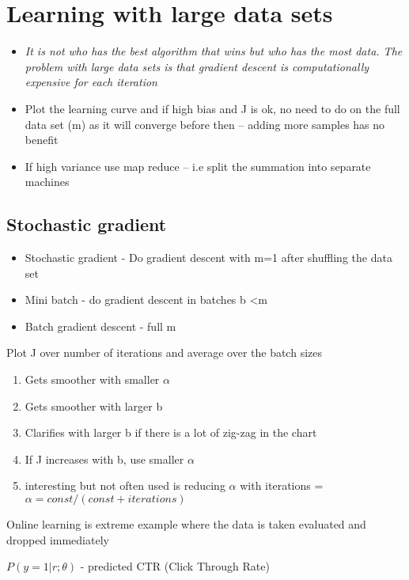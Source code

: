 \documentclass[12pt,a4paper]{article}
\begin{document}
\section{Learning with large data sets}
\begin{itemize}
\item \emph{It is not who has the best algorithm that wins but who has the most data. The problem with large data sets is that gradient descent is computationally expensive for each iteration} 
\item Plot the learning curve and if high bias and J is ok, no need to do on the full data set (m) as it will converge before then -- adding more samples has no benefit
\item If high variance use map reduce -- i.e split the summation into separate machines

\end{itemize}


\subsection{Stochastic gradient} 
\begin{itemize}
\item Stochastic gradient - Do gradient descent with m=1 after shuffling the data set
\item Mini batch - do gradient descent in batches b \textless m
\item Batch gradient descent - full m
\end{itemize}

Plot J over number of iterations and average over the batch sizes
\begin{enumerate}
\item Gets smoother with smaller $\alpha$
\item Gets smoother with larger b
\item Clarifies with larger b if there is a lot of zig-zag in the chart
\item If J increases with b, use smaller $\alpha$
\item interesting but not often used is reducing $\alpha$ with iterations = $\alpha = const/(const+iterations)$

\end{enumerate}

Online learning is extreme example where the data is taken evaluated and dropped immediately

$P(y=1|r;\theta)$ - predicted CTR (Click Through Rate)
\end{document}
